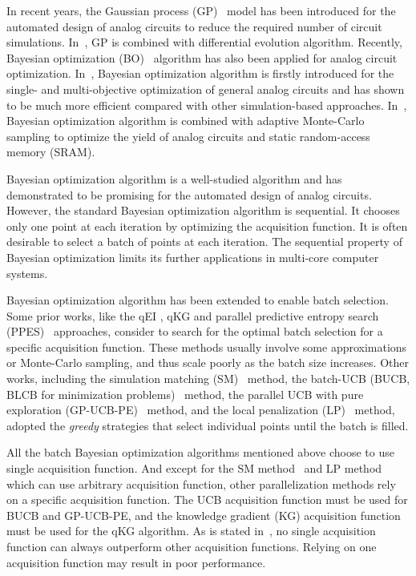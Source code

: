 
In recent years, the Gaussian process (GP)~\cite{GPML} model has been
introduced for the automated design of analog circuits to reduce the
required number of circuit simulations. In~\citet{liu2014gaspad}, GP is combined
with differential evolution algorithm. Recently, Bayesian optimization
(BO)~\cite{shahriari2016taking} algorithm has also been applied for analog
circuit optimization. In~\citet{lyu2017efficient}, Bayesian optimization
algorithm is firstly introduced for the single- and multi-objective
optimization of general analog circuits and has shown to be much more efficient
compared with other simulation-based approaches. In~\citet{wang2017efficient},
Bayesian optimization algorithm is combined with adaptive Monte-Carlo
sampling to optimize the yield of analog circuits and static random-access
memory (SRAM).

Bayesian optimization algorithm is a well-studied algorithm and has
demonstrated to be promising for the automated design of analog circuits.
However, the standard Bayesian optimization algorithm is sequential. It chooses
only one point at each iteration by optimizing the acquisition function. It is
often desirable to select a batch of points at each iteration. The sequential
property of Bayesian optimization limits its further applications in multi-core computer systems.

Bayesian optimization algorithm has been extended to enable batch
selection. Some prior works, like the qEI \cite{qEI}, qKG \cite{wu2016parallel}
and parallel predictive entropy search (PPES)~\cite{shah2015parallel}
approaches, consider to search for the optimal batch selection for a specific
acquisition function. These methods usually involve some approximations or
Monte-Carlo sampling, and thus scale poorly as the batch size increases. Other
works, including the simulation matching (SM)~\cite{azimi2010batch} method, the
batch-UCB (BUCB, BLCB for minimization
problems)~\cite{desautels2014parallelizing} method, the parallel UCB with pure
exploration (GP-UCB-PE)~\cite{contal2013parallel} method, and the local
penalization (LP)~\cite{gonzalez2016batch} method, adopted the \emph{greedy}
strategies that select individual points until the batch is filled.

All the batch Bayesian optimization algorithms mentioned above choose to use single acquisition function.
And except for the SM method~\cite{azimi2010batch} and LP method~\cite{gonzalez2016batch} which can use arbitrary acquisition
function, other parallelization methods rely on a specific acquisition
function. The UCB acquisition function must be used for BUCB and GP-UCB-PE, and
the knowledge gradient (KG) acquisition function must be used for the qKG algorithm. As is stated
in~\citet{hoffman2011portfolio}, no single acquisition function can always
outperform other acquisition functions. Relying on one acquisition function may
result in poor performance.

